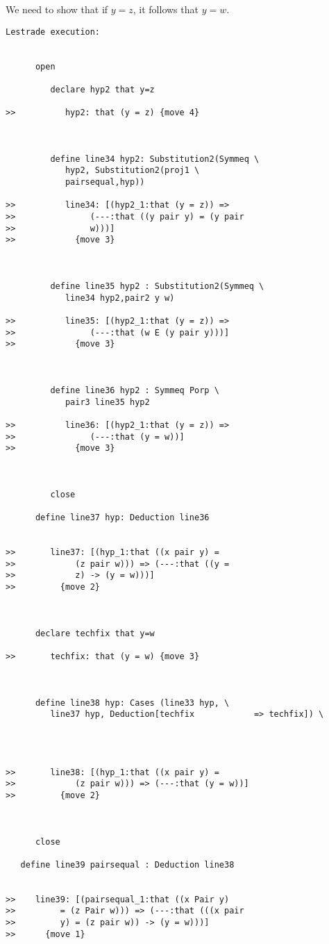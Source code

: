 \documentclass{article}
\begin{document}
We need to show that if $y=z$, it follows that $y=w$.

\begin{verbatim}Lestrade execution:


      open

         declare hyp2 that y=z

>>          hyp2: that (y = z) {move 4}



         define line34 hyp2: Substitution2(Symmeq \
            hyp2, Substitution2(proj1 \
            pairsequal,hyp))

>>          line34: [(hyp2_1:that (y = z)) =>
>>               (---:that ((y pair y) = (y pair
>>               w)))]
>>            {move 3}



         define line35 hyp2 : Substitution2(Symmeq \
            line34 hyp2,pair2 y w)

>>          line35: [(hyp2_1:that (y = z)) =>
>>               (---:that (w E (y pair y)))]
>>            {move 3}



         define line36 hyp2 : Symmeq Porp \
            pair3 line35 hyp2

>>          line36: [(hyp2_1:that (y = z)) =>
>>               (---:that (y = w))]
>>            {move 3}



         close

      define line37 hyp: Deduction line36


>>       line37: [(hyp_1:that ((x pair y) =
>>            (z pair w))) => (---:that ((y =
>>            z) -> (y = w)))]
>>         {move 2}



      declare techfix that y=w

>>       techfix: that (y = w) {move 3}



      define line38 hyp: Cases (line33 hyp, \
         line37 hyp, Deduction[techfix            => techfix]) \
         



>>       line38: [(hyp_1:that ((x pair y) =
>>            (z pair w))) => (---:that (y = w))]
>>         {move 2}



      close

   define line39 pairsequal : Deduction line38


>>    line39: [(pairsequal_1:that ((x Pair y)
>>         = (z Pair w))) => (---:that (((x pair
>>         y) = (z pair w)) -> (y = w)))]
>>      {move 1}




\end{verbatim}
\end{document}
